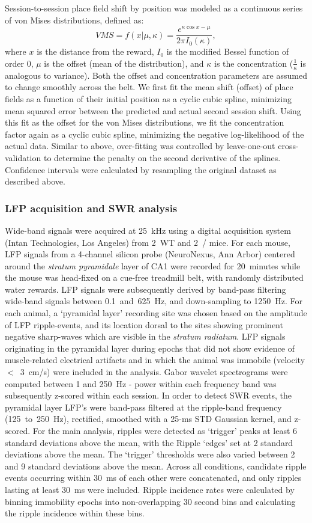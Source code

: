Session-to-session place field shift by position was modeled as a continuous series of von Mises distributions, defined as:
$$VMS = f(x|\mu,\kappa) = \frac{e^{\kappa\cos x-\mu }}{2\pi I_0(\kappa)},$$
where $x$ is the distance from the reward, $I_0$ is the modified Bessel function of order 0, $\mu$ is the offset (mean of the distribution), and $\kappa$ is the concentration ($\frac{1}{\kappa}$ is analogous to variance). Both the offset and concentration parameters are assumed to change smoothly across the belt. We first fit the mean shift (offset) of place fields as a function of their initial position as a cyclic cubic spline, minimizing mean squared error between the predicted and actual second session shift. Using this fit as the offset for the von Mises distributions, we fit the concentration factor again as a cyclic cubic spline, minimizing the negative log-likelihood of the actual data. Similar to above, over-fitting was controlled by leave-one-out cross-validation to determine the penalty on the second derivative of the splines. Confidence intervals were calculated by resampling the original dataset as described above.

\subsubsection{LFP acquisition and \acl{SWR} analysis}
\label{sec:df:methods:SWR}
Wide-band signals were acquired at 25~kHz using a digital acquisition system (Intan Technologies, Los Angeles) from 2~WT and 2~\df/ mice. For each mouse, LFP signals from a 4-channel silicon probe (NeuroNexus, Ann Arbor) centered around the \emph{stratum pyramidale} layer of CA1 were recorded for 20~minutes while the mouse was head-fixed on a cue-free treadmill belt, with randomly distributed water rewards. LFP signals were subsequently derived by band-pass filtering wide-band signals between 0.1~and~625~Hz, and down-sampling to 1250~Hz. For each animal, a `pyramidal layer' recording site was chosen based on the amplitude of LFP ripple-events, and its location dorsal to the sites showing prominent negative sharp-waves which are visible in the \emph{stratum radiatum}. LFP signals originating in the pyramidal layer during epochs that did not show evidence of muscle-related electrical artifacts and in which the animal was immobile (velocity $<$~3~cm/s) were included in the analysis. Gabor wavelet spectrograms were computed between 1 and 250~Hz - power within each frequency band was subsequently z-scored within each session. In order to detect SWR events, the pyramidal layer LFP's were band-pass filtered at the ripple-band frequency (125~to~250~Hz), rectified, smoothed with a 25-ms STD Gaussian kernel, and z-scored. For the main analysis, ripples were detected as `trigger' peaks at least 6 standard deviations above the mean, with the Ripple `edges' set at 2 standard deviations above the mean. The `trigger' thresholds were also varied between 2 and 9 standard deviations above the mean. Across all conditions, candidate ripple events occurring within 30~ms of each other were concatenated, and only ripples lasting at least 30~ms were included. Ripple incidence rates were calculated by binning immobility epochs into non-overlapping 30 second bins and calculating the ripple incidence within these bins.


